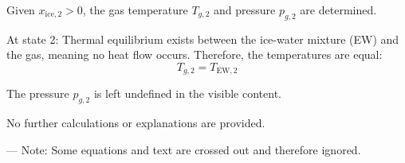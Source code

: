 Given \( x_{\text{ice},2} > 0 \), the gas temperature \( T_{g,2} \) and pressure \( p_{g,2} \) are determined.  

At state 2:  
Thermal equilibrium exists between the ice-water mixture (EW) and the gas, meaning no heat flow occurs. Therefore, the temperatures are equal:  
\[
T_{g,2} = T_{\text{EW},2}
\]  

The pressure \( p_{g,2} \) is left undefined in the visible content.  

No further calculations or explanations are provided.  

---  
Note: Some equations and text are crossed out and therefore ignored.